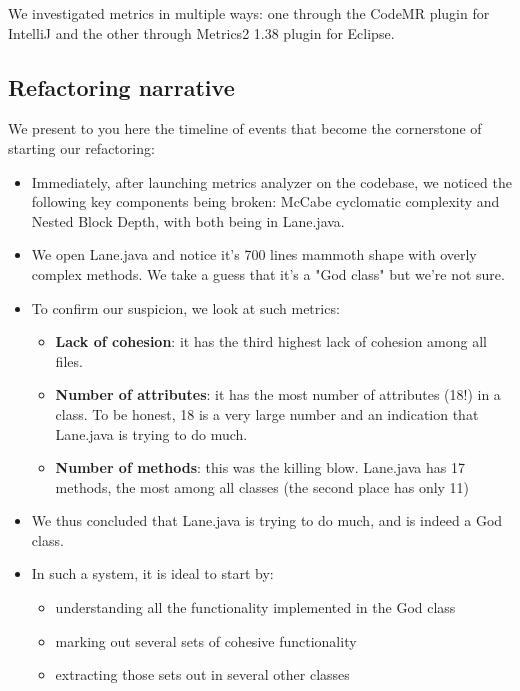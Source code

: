 We investigated metrics in multiple ways: one through the CodeMR plugin for IntelliJ and the other through Metrics2 1.38 plugin for Eclipse.

\subsection{Refactoring narrative}

We present to you here the timeline of events that become the cornerstone of starting our refactoring:

\begin{itemize}

    \item Immediately, after launching metrics analyzer on the codebase, we noticed the following key components being broken: McCabe cyclomatic complexity and Nested Block Depth, with both being in Lane.java.
    \item We open Lane.java and notice it's 700 lines mammoth shape with overly complex methods. We take a guess that it's a "God class" but we're not sure.
    \item To confirm our suspicion, we look at such metrics:

          \begin{itemize}
              \item \textbf{Lack of cohesion}: it has the third highest lack of cohesion among all files.
              \item \textbf{Number of attributes}: it has the most number of attributes (18!) in a class. To be honest, 18 is a very large number and an indication that Lane.java is trying to do much.
              \item \textbf{Number of methods}: this was the killing blow. Lane.java has 17 methods, the most among all classes (the second place has only 11)
          \end{itemize}

    \item We thus concluded that Lane.java is trying to do much, and is indeed a God class.
    \item In such a system, it is ideal to start by:
          \begin{itemize}
              \item understanding all the functionality implemented in the God class
              \item marking out several sets of cohesive functionality
              \item extracting those sets out in several other classes
          \end{itemize}


\end{itemize}
